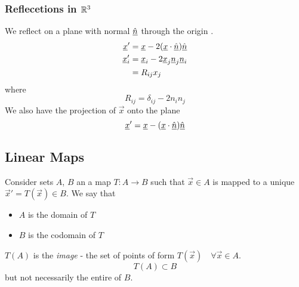 \documentclass{article}
\numberwithin{equation}{section}
\begin{document}

\subsubsection{Reflecetions in $\mathbb{R}^3$}
We reflect on a plane with normal $\hat{\underline{n}}$ through the origin .
\begin{align*}
    \underline{x}' &= \underline{x} - 2 (\underline{x} \cdot \hat{\underline{n}}) \hat{\underline{n}} \\
    \underline{x}'_i &= \underline{x}_i - 2 \underline{x}_j \underline{n}_j \underline{n}_i \\
    &= R_{ij}x_j \\
\end{align*}
where
\begin{equation}\label{eq:3-3}
    R_{ij} = \delta_{ij} - 2 n_i n_j
\end{equation}
We also have the projection of $\vec x$ onto the plane
\begin{equation}\label{eq:3-4}
    \underline{x}' = \underline{x} - (\underline{x} \cdot \hat{\underline{n}}) \hat{\underline{n}}
\end{equation}

\subsection{Linear Maps}
Consider sets $A$, $B$ an a map $T: A \rightarrow B$ such that $\vec x \in A$ is mapped to a unique $\vec x' = T(\vec x) \in B$. 
We say that
\begin{itemize}
    \item $A$ is the domain of $T$
    \item $B$ is the codomain of $T$
\end{itemize}
\begin{remark}[Image]
    $T(A)$ is the \emph{image} - the set of points of form $T(\vec x) \quad \forall \vec x \in A$.
    \[
        T(A) \subset B  
    \]
    but not necessarily the entire of $B$.
\end{remark}
\end{document}
